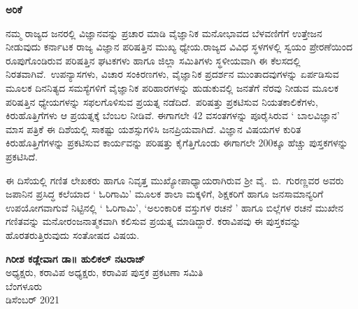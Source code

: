 


\vspace{-1.5cm}

\begin{center}
{\LARGE\textbf{{ಅರಿಕೆ }}}
\end{center}

\noindent
ನಮ್ಮ ರಾಜ್ಯದ ಜನರಲ್ಲಿ ವಿಜ್ಞಾನವನ್ನು ಪ್ರಚಾರ ಮಾಡಿ ವೈಜ್ಞಾನಿಕ ಮನೋಭಾವದ ಬೆಳ\break ವಣಿಗೆಗೆ ಉತ್ತೇಜನ ನೀಡುವುದು  ಕರ್ನಾಟಕ ರಾಜ್ಯ ವಿಜ್ಞಾನ ಪರಿಷತ್ತಿನ ಮುಖ್ಯ ಧ್ಯೇಯ.\break ರಾಜ್ಯದ ವಿವಿಧ ಸ್ಥಳಗಳಲ್ಲಿ ಸ್ವಯಂ ಪ್ರೇರಣೆಯಿಂದ ರೂಪುಗೊಂಡಿರುವ ಪರಿಷತ್ತಿನ  ಘಟಕ\break ಗಳು ಹಾಗೂ ಜಿಲ್ಲಾ ಸಮಿತಿಗಳು ಸ್ಥಳೀಯವಾಗಿ ಈ ಕೆಲಸದಲ್ಲಿ ನಿರತವಾಗಿವೆ.~ಉಪನ್ಯಾಸಗಳು, ವಿಚಾರ ಸಂಕಿರಣಗಳು, ವೈಜ್ಞಾನಿಕ ಪ್ರದರ್ಶನ ಮುಂತಾದವುಗಳನ್ನು ಏರ್ಪಡಿಸುವ ಮೂಲಕ ದಿನನಿತ್ಯದ ಸಮಸ್ಯೆಗಳಿಗೆ ವೈಜ್ಞಾನಿಕ ಪರಿಹಾರಗಳನ್ನು ಹುಡುಕುವಲ್ಲಿ ಜನತೆಗೆ ನೆರವು ನೀಡುವ ಮೂಲಕ ಪರಿಷತ್ತಿನ ಧ್ಯೇಯಗಳನ್ನು ಸಫಲಗೊಳಿಸುವ ಪ್ರಯತ್ನ ನಡೆದಿದೆ.~ಪರಿಷತ್ತು ಪ್ರಕಟಿಸುವ ನಿಯತಕಾಲಿಕೆಗಳು, ಕಿರುಹೊತ್ತಿಗೆಗಳು ಆ ಪ್ರಯತ್ನಕ್ಕೆ ಬೆಂಬಲ ನೀಡಿವೆ. ಈಗಾ\break ಗಲೇ 42 ವಸಂತಗಳನ್ನು ಪೂರೈಸಿರುವ ` ಬಾಲವಿಜ್ಞಾನ' ಮಾಸ ಪತ್ರಿಕೆ ಈ ದಿಶೆಯಲ್ಲಿ ಸಾಕಷ್ಟು ಯಶಸ್ಸುಗಳಿಸಿ ಜನಪ್ರಿಯವಾಗಿದೆ. ವಿಜ್ಞಾನ ವಿಷಯಗಳ ಕುರಿತ ಕಿರುಹೊತ್ತಿಗೆಗಳನ್ನು ಪ್ರಕಟಿಸುವ ಕಾರ್ಯವನ್ನು ಪರಿಷತ್ತು ಕೈಗೆತ್ತಿಗೊಂಡು ಈಗಾಗಲೇ 200ಕ್ಕೂ ಹೆಚ್ಚು ಪುಸ್ತಕಗಳನ್ನು ಪ್ರಕಟಿಸಿದೆ.

\noindent
ಈ ದಿಸೆಯಲ್ಲಿ ಗಣಿತ ಲೇಖಕರು ಹಾಗೂ ನಿವೃತ್ತ ಮುಖ್ಯೋಪಾಧ್ಯಾಯರಾಗಿರುವ ಶ್ರೀ ವೈ.~ಬಿ.~ಗುರಣ್ಣವರ ಅವರು ಜಪಾನಿನ ಪ್ರಸಿದ್ಧ ಕಲೆಯಾದ ` ಓರಿಗಾಮಿ' ಮೂಲಕ ಶಾಲಾ ಮಕ್ಕಳಿಗೆ, ಶಿಕ್ಷಕರಿಗೆ ಹಾಗೂ ಜನಸಾಮಾನ್ಯರಿಗೆ ಉಪಯೋಗವಾಗುವೆ ನಿಟ್ಟಿನಲ್ಲಿ ` ಓರಿಗಾಮಿ', `ಅಲಂಕಾರಿಕ ವಸ್ತುಗಳ ರಚನೆ ' ಹಾಗೂ ಬಿಲ್ಲೆಗಳ ರಚನೆ ಮುಖೇನ ಗಣಿತವನ್ನು ಮನೋರಂಜನಾತ್ಮಕವಾಗಿ ಕಲಿಸುವ ಪ್ರಯತ್ನ ಮಾಡಿದ್ದಾರೆ. ಕರಾವಿಪವು ಈ ಪುಸ್ತಕವನ್ನು ಹೊರತರುತ್ತಿರುವುದು ಸಂತೋಷದ ವಿಷಯ. 

\noindent
\textbf{ಗಿರೀಶ ಕಡ್ಲೇವಾಗ \hfill ಡಾ॥ ಹುಲಿಕಲ್ ನಟರಾಜ್\\[-.1cm]}
ಅಧ್ಯಕ್ಷರು, ಕರಾವಿಪ \hfill ಅಧ್ಯಕ್ಷರು, ಕರಾವಿಪ ಪುಸ್ತಕ ಪ್ರಕಟಣಾ ಸಮಿತಿ\\[.1cm] 
ಬೆಂಗಳೂರು \\
ಡಿಸೆಂಬರ್ 2021


